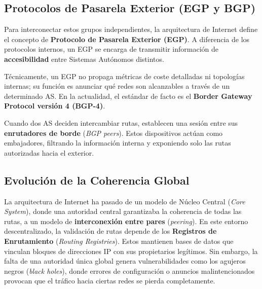\subsection{Protocolos de Pasarela Exterior (EGP y BGP)}

Para interconectar estos grupos independientes, la arquitectura de Internet define el concepto de \textbf{Protocolo de Pasarela Exterior (EGP)}. A diferencia de los protocolos internos, un EGP se encarga de transmitir información de \textbf{accesibilidad} entre Sistemas Autónomos distintos.

Técnicamente, un EGP no propaga métricas de coste detalladas ni topologías internas; su función es anunciar qué redes son alcanzables a través de un determinado AS. En la actualidad, el estándar de facto es el \textbf{Border Gateway Protocol versión 4 (BGP-4)}.

Cuando dos AS deciden intercambiar rutas, establecen una sesión entre sus \textbf{enrutadores de borde} (\textit{BGP peers}). Estos dispositivos actúan como embajadores, filtrando la información interna y exponiendo solo las rutas autorizadas hacia el exterior.

\subsection{Evolución de la Coherencia Global}

La arquitectura de Internet ha pasado de un modelo de Núcleo Central (\textit{Core System}), donde una autoridad central garantizaba la coherencia de todas las rutas, a un modelo de \textbf{interconexión entre pares} (\textit{peering}). En este entorno descentralizado, la validación de rutas depende de los \textbf{Registros de Enrutamiento} (\textit{Routing Registries}). Estos mantienen bases de datos que vinculan bloques de direcciones IP con sus propietarios legítimos. Sin embargo, la falta de una autoridad única global genera vulnerabilidades como los agujeros negros (\textit{black holes}), donde errores de configuración o anuncios malintencionados provocan que el tráfico hacia ciertas redes se pierda completamente.
